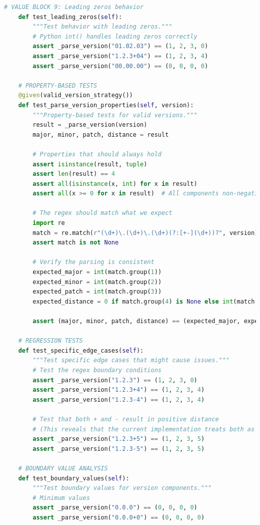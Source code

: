 \documentclass[a4paper]{scrreprt}
\begin{document}
\begin{aiTask}
\begin{answer}
\begin{lstlisting}[language=Python]
    # VALUE BLOCK 9: Leading zeros behavior
    def test_leading_zeros(self):
        """Test behavior with leading zeros."""
        # Python int() handles leading zeros correctly
        assert _parse_version("01.02.03") == (1, 2, 3, 0)
        assert _parse_version("1.2.3+04") == (1, 2, 3, 4)
        assert _parse_version("00.00.00") == (0, 0, 0, 0)
    
    # PROPERTY-BASED TESTS
    @given(valid_version_strategy())
    def test_parse_version_properties(self, version):
        """Property-based tests for valid versions."""
        result = _parse_version(version)
        major, minor, patch, distance = result
        
        # Properties that should always hold
        assert isinstance(result, tuple)
        assert len(result) == 4
        assert all(isinstance(x, int) for x in result)
        assert all(x >= 0 for x in result)  # All components non-negative
        
        # The regex should match what we expect
        import re
        match = re.match(r"(\d+)\.(\d+)\.(\d+)(?:[+-](\d+))?", version)
        assert match is not None
        
        # Verify the parsing is consistent
        expected_major = int(match.group(1))
        expected_minor = int(match.group(2)) 
        expected_patch = int(match.group(3))
        expected_distance = 0 if match.group(4) is None else int(match.group(4))
        
        assert (major, minor, patch, distance) == (expected_major, expected_minor, expected_patch, expected_distance)
    
    # REGRESSION TESTS
    def test_specific_edge_cases(self):
        """Test specific edge cases that might cause issues."""
        # Test the regex boundary conditions
        assert _parse_version("1.2.3") == (1, 2, 3, 0)
        assert _parse_version("1.2.3+4") == (1, 2, 3, 4)
        assert _parse_version("1.2.3-4") == (1, 2, 3, 4)
        
        # Test that both + and - result in positive distance
        # (This reveals that the current implementation treats both as positive)
        assert _parse_version("1.2.3+5") == (1, 2, 3, 5)
        assert _parse_version("1.2.3-5") == (1, 2, 3, 5)
    
    # BOUNDARY VALUE ANALYSIS
    def test_boundary_values(self):
        """Test boundary values for version components."""
        # Minimum values
        assert _parse_version("0.0.0") == (0, 0, 0, 0)
        assert _parse_version("0.0.0+0") == (0, 0, 0, 0)
        

\end{lstlisting}
\end{answer}
\end{aiTask}
\end{document}
